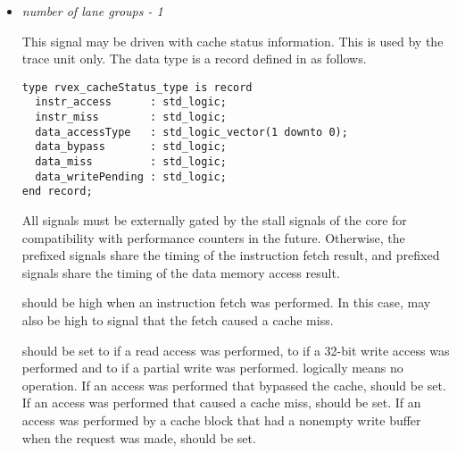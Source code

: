 \begin{itemize}
\vspace{1em}
\item {}\textit{number of lane groups - 1}

This signal may be driven with cache status information. This is used by the 
trace unit only. The data type is a record defined in  as 
follows.

\begin{lstlisting}[numbers=none]
type rvex_cacheStatus_type is record
  instr_access      : std_logic;
  instr_miss        : std_logic;
  data_accessType   : std_logic_vector(1 downto 0);
  data_bypass       : std_logic;
  data_miss         : std_logic;
  data_writePending : std_logic;
end record;
\end{lstlisting}

All signals must be externally gated by the stall signals of the core for 
compatibility with performance counters in the future. Otherwise, the 
 prefixed signals share the timing of the instruction fetch result, 
and  prefixed signals share the timing of the data memory access 
result.

 should be high when an instruction fetch was performed. In
this case,  may also be high to signal that the fetch caused a
cache miss.

 should be set to  if a read access was performed,
to  if a 32-bit write access was performed and to  if a
partial write was performed.  logically means no operation. If an
access was performed that bypassed the cache,  should be set.
If an access was performed that caused a cache miss,  should be
set. If an access was performed by a cache block that had a nonempty write
buffer when the request was made,  should be set.


\end{itemize}

